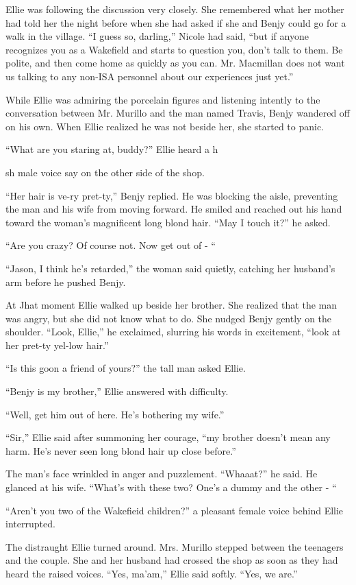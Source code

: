 \documentclass[]{article}
\begin{document}
{Ellie was following the discussion very closely. She remembered what her mother had told her the night before when she had asked if she and Benjy could go for a walk in the village. “I guess so, darling,” Nicole had said, “but if anyone recognizes you as a Wakefield and starts to question you, don’t talk to them. Be polite, and then come home as quickly as you can. Mr. Macmillan does not want us talking to any non-ISA personnel about our experiences just yet.”

While Ellie was admiring the porcelain figures and listening intently to the conversation between Mr. Murillo and the man named Travis, Benjy wandered off on his own. When Ellie realized he was not beside her, she started to panic.

“What are you staring at, buddy?” Ellie heard a h

sh male voice say on the other side of the shop.

“Her hair is ve-ry pret-ty,” Benjy replied. He was blocking the aisle, preventing the man and his wife from moving forward. He smiled and reached out his hand toward the woman’s magnificent long blond hair. “May I touch it?” he asked.

“Are you crazy? Of course not. Now get out of - “

“Jason, I think he’s retarded,” the woman said quietly, catching her husband’s arm before he pushed Benjy.

At Jhat moment Ellie walked up beside her brother. She realized that the man was angry, but she did not know what to do. She nudged Benjy gently on the shoulder. “Look, Ellie,” he exclaimed, slurring his words in excitement, “look at her pret-ty yel-low hair.”

“Is this goon a friend of yours?” the tall man asked Ellie.

“Benjy is my brother,” Ellie answered with difficulty.

“Well, get him out of here. He’s bothering my wife.”

“Sir,” Ellie said after summoning her courage, “my brother doesn’t mean any harm. He’s never seen long blond hair up close before.”

The man’s face wrinkled in anger and puzzlement. “Whaaat?” he said. He glanced at his wife. “What’s with these two? One’s a dummy and the other - “

“Aren’t you two of the Wakefieid children?” a pleasant female voice behind Ellie interrupted.

The distraught Ellie turned around. Mrs. Murillo stepped between the teenagers and the couple. She and her husband had crossed the shop as soon as they had heard the raised voices. “Yes, ma’am,” Ellie said softly. “Yes, we are.”

}
\end{document}
